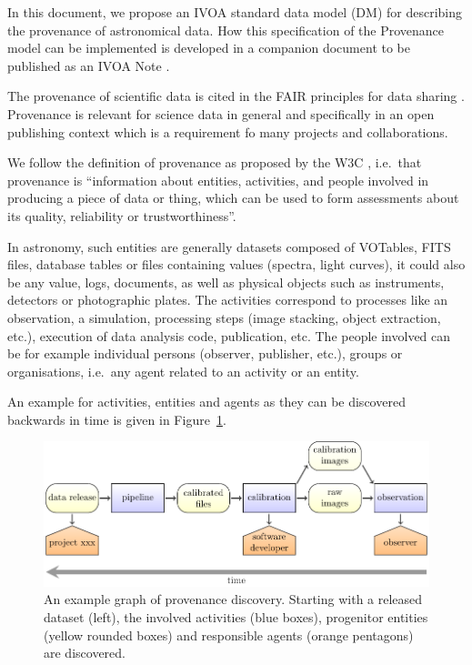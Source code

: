 
In this document, we propose an IVOA standard data model (DM) for describing the provenance of astronomical data. 
How this specification of the Provenance model can be implemented is developed in a companion document to be published as an IVOA Note \citep{std:ProvenanceImplementationNote}.

The provenance of scientific data is cited in the FAIR principles for data sharing \citep{FAIR-principles}.
Provenance is relevant for science data in general and specifically in an open publishing context which is a requirement fo many
projects and collaborations.

We follow the definition of provenance as proposed by the W3C \citep{std:W3CProvDM}, i.e.~that provenance is ``information about entities, activities, and people involved in producing a piece of data or thing, which can be used to form assessments about its quality, reliability or trustworthiness''.

In astronomy, such entities are generally datasets composed of VOTables, FITS files, database tables or files containing values (spectra, light curves),  it could also be any value, logs, documents, as well as physical objects such as instruments, detectors or photographic plates.
The activities correspond to processes like an observation, a simulation, processing steps (image stacking, object extraction, etc.), execution of data analysis code, publication, etc.
The people involved can be for example individual persons (observer, publisher, etc.), groups or organisations, i.e.~any agent related to an activity or an entity.

An example for activities, entities and agents as they can be discovered backwards in time is given in Figure~\ref{fig:example-workflow}.


\begin{figure}[ht]
\centering
\includegraphics[width=1\textwidth]{workflow-backwards.pdf}
\caption[Example graph of provenance discovery]{An example graph of provenance discovery. Starting with a released dataset (left), the involved activities (blue boxes), 
progenitor entities (yellow rounded boxes) and responsible agents (orange pentagons) are 
discovered.}
\label{fig:example-workflow}
\end{figure}


